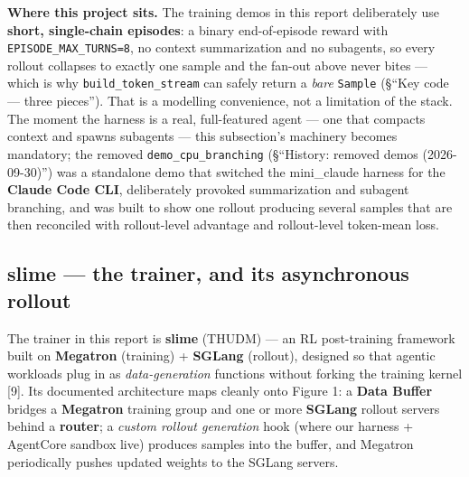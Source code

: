 \documentclass[
  paper=a4,
  ,captions=tableheading
]{scrartcl}
\begin{document}
\textbf{Where this project sits.} The training demos in this report
deliberately use \textbf{short, single-chain episodes}: a binary
end-of-episode reward with \texttt{EPISODE\_MAX\_TURNS=8}, no context
summarization and no subagents, so every rollout collapses to exactly
one sample and the fan-out above never bites --- which is why
\texttt{build\_token\_stream} can safely return a \emph{bare}
\texttt{Sample} (§``Key code --- three pieces''). That is a modelling
convenience, not a limitation of the stack. The moment the harness is a
real, full-featured agent --- one that compacts context and spawns
subagents --- this subsection's machinery becomes mandatory; the removed
\texttt{demo\_cpu\_branching} (§``History: removed demos (2026-09-30)'')
was a standalone demo that switched the mini\_claude harness for the
\textbf{Claude Code CLI}, deliberately provoked summarization and
subagent branching, and was built to show one rollout producing several
samples that are then reconciled with rollout-level advantage and
rollout-level token-mean loss.

\hypertarget{slime-the-trainer-and-its-asynchronous-rollout}{%
\subsection{slime --- the trainer, and its asynchronous
rollout}\label{slime-the-trainer-and-its-asynchronous-rollout}}

The trainer in this report is \textbf{slime} (THUDM) --- an RL
post-training framework built on \textbf{Megatron} (training) +
\textbf{SGLang} (rollout), designed so that agentic workloads plug in as
\emph{data-generation} functions without forking the training kernel
{[}9{]}. Its documented architecture maps cleanly onto Figure 1: a
\textbf{Data Buffer} bridges a \textbf{Megatron} training group and one
or more \textbf{SGLang} rollout servers behind a \textbf{router}; a
\emph{custom rollout generation} hook (where our harness + AgentCore
sandbox live) produces samples into the buffer, and Megatron
periodically pushes updated weights to the SGLang servers.
\end{document}
